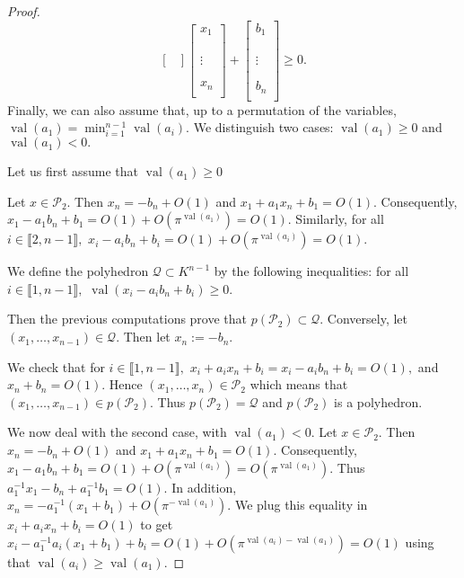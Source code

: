\documentclass[a4paper,oneside,11pt]{article}
\newcommand{\PP}{\mathcal{P}}
\newcommand{\Qc}{\mathcal{Q}}
\DeclareMathOperator{\val}{val}
\begin{document}
\begin{proof}
\[\begin{bmatrix}
\end{bmatrix} \begin{bmatrix} x_1 \\ \\  \\ \\ \vdots \\  \\ \\ x_n \\ \end{bmatrix} + \begin{bmatrix} b_1 \\ \\ \\  \\ \vdots  \\ \\ \\ b_n \\ \end{bmatrix}  \geq 0.\]
Finally, we can also assume that, up to a permutation of the variables, $\val(a_1)= \min_{i=1}^{n-1} \val(a_i).$
We distinguish two cases: $\val(a_1) \geq 0$ and $\val(a_1)<0.$

Let us first assume that $\val(a_1) \geq 0$

Let $x \in \PP_2$.
Then $x_n=-b_n+O(1)$
and $x_1+a_1 x_n+b_1=O(1).$
Consequently, $x_1-a_1 b_n +b_1=O(1)+O(\pi^{\val(a_1)})=O(1).$
Similarly, for all $i \in \llbracket 2,n-1 \rrbracket,$
$x_i-a_ib_n+b_i=O(1)+O(\pi^{\val(a_i)})=O(1).$

We define the polyhedron $\Qc \subset K^{n-1}$ by the following inequalities:
 for all $i \in \llbracket 1,n-1 \rrbracket,$
$\val(x_i-a_ib_n+b_i) \geq 0.$

Then the previous computations prove that $p(\PP_2)\subset \Qc.$
Conversely, let $(x_1,\dots,x_{n-1}) \in \Qc.$
Then let $x_n := -b_n.$

We check that for $i \in \llbracket 1,n-1 \rrbracket,$
$x_i+a_ix_n+b_i=x_i-a_ib_n+b_i=O(1),$
and $x_n+b_n=O(1)$. Hence $(x_1,\dots,x_n) \in \PP_2$
which means that $(x_1,\dots,x_{n-1}) \in p(\PP_2).$
Thus $p(\PP_2)= \Qc$ and $p(\PP_2)$ is a polyhedron.

We now deal with the second case, with $\val(a_1)<0.$
Let $x \in \PP_2$.
Then $x_n=-b_n+O(1)$
and $x_1+a_1 x_n+b_1=O(1).$
Consequently, $x_1-a_1 b_n +b_1=O(1)+O(\pi^{\val(a_1)})=O(\pi^{\val(a_1)}).$
Thus $a_1^{-1}x_1- b_n +a_1^{-1}b_1=O(1)$.
In addition, $x_n=-a_1^{-1}(x_1+b_1)+O(\pi^{-\val(a_1)}).$
We plug this equality in 
$x_i+a_i x_n+b_i=O(1)$ to get
$x_i-a_1^{-1}a_i(x_1+b_1)+b_i=O(1)+O(\pi^{\val(a_i)-\val(a_1)})=O(1)$
using that $\val(a_i) \geq \val (a_1).$


\end{proof}
\end{document}
